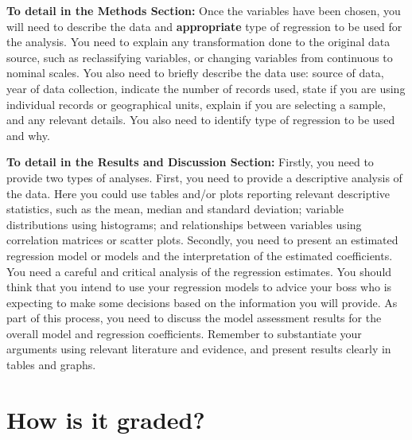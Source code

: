 \documentclass[
  letterpaper,
  DIV=11,
  numbers=noendperiod]{scrreprt}
\begin{document}
\textbf{To detail in the Methods Section:} Once the variables have been
chosen, you will need to describe the data and \textbf{appropriate} type
of regression to be used for the analysis. You need to explain any
transformation done to the original data source, such as reclassifying
variables, or changing variables from continuous to nominal scales. You
also need to briefly describe the data use: source of data, year of data
collection, indicate the number of records used, state if you are using
individual records or geographical units, explain if you are selecting a
sample, and any relevant details. You also need to identify type of
regression to be used and why.

\textbf{To detail in the Results and Discussion Section:} Firstly, you
need to provide two types of analyses. First, you need to provide a
descriptive analysis of the data. Here you could use tables and/or plots
reporting relevant descriptive statistics, such as the mean, median and
standard deviation; variable distributions using histograms; and
relationships between variables using correlation matrices or scatter
plots. Secondly, you need to present an estimated regression model or
models and the interpretation of the estimated coefficients. You need a
careful and critical analysis of the regression estimates. You should
think that you intend to use your regression models to advice your boss
who is expecting to make some decisions based on the information you
will provide. As part of this process, you need to discuss the model
assessment results for the overall model and regression coefficients.
Remember to substantiate your arguments using relevant literature and
evidence, and present results clearly in tables and graphs.

\section*{How is it graded?}\label{how-is-it-graded}

\end{document}
